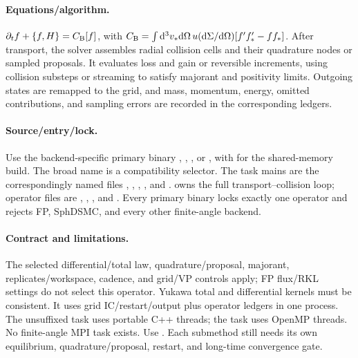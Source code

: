 \paragraph{Equations/algorithm.}
\(\partial_t f+\{f,H\}=C_{\rm B}[f]\), with
\(C_{\rm B}=\int\mathrm d^3v_*\mathrm d\Omega\,u(\mathrm d\Sigma/\mathrm d\Omega)
[f'f_*'-ff_*]\).  After transport, the solver assembles radial collision cells and their
quadrature nodes or sampled proposals. It evaluates loss and gain or
reversible increments, using collision substeps or streaming to satisfy
majorant and positivity limits. Outgoing states are remapped to the grid, and
mass, momentum, energy, omitted contributions, and sampling errors are
recorded in the corresponding ledgers.
\paragraph{Source/entry/lock.}
Use the backend-specific primary binary
,
,
, or
, with 
for the shared-memory build.  The broad
 name is a compatibility
selector.  The task mains are the correspondingly named files
,
,
,
, and
.
 owns the full transport--collision loop;
operator files are
,
,
, and
.  Every primary binary locks exactly
one operator and rejects FP, SphDSMC, and every other finite-angle backend.
\paragraph{Contract and limitations.}
The selected differential/total law, quadrature/proposal, majorant,
replicates/workspace, cadence, and grid/VP controls apply; FP flux/RKL settings
do not select this operator.  Yukawa total and differential kernels must be
consistent.  It uses grid IC/restart/output plus operator ledgers in one
process.  The unsuffixed task uses portable C++ threads; the
 task uses OpenMP threads.  No finite-angle MPI task exists.  Use
.  Each submethod still
needs its own equilibrium,
quadrature/proposal, restart, and long-time convergence gate.


